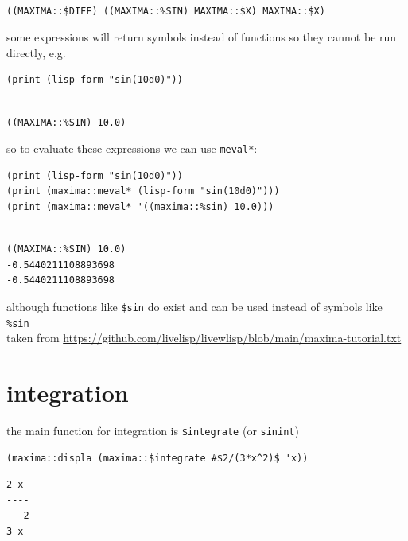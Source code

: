 \documentclass[a4paper,12pt]{article}
\begin{document}
\begin{verbatim}

((MAXIMA::$DIFF) ((MAXIMA::%SIN) MAXIMA::$X) MAXIMA::$X) 
\end{verbatim}


some expressions will return symbols instead of functions so they cannot be run directly, e.g.\\
\lstset{language=Lisp,label= ,caption= ,captionpos=b,numbers=none}
\begin{lstlisting}
(print (lisp-form "sin(10d0)"))
\end{lstlisting}

\begin{verbatim}

((MAXIMA::%SIN) 10.0) 
\end{verbatim}


so to evaluate these expressions we can use \texttt{meval*}:\\
\lstset{language=Lisp,label= ,caption= ,captionpos=b,numbers=none}
\begin{lstlisting}
(print (lisp-form "sin(10d0)"))
(print (maxima::meval* (lisp-form "sin(10d0)")))
(print (maxima::meval* '((maxima::%sin) 10.0)))
\end{lstlisting}

\begin{verbatim}

((MAXIMA::%SIN) 10.0) 
-0.5440211108893698 
-0.5440211108893698 
\end{verbatim}


although functions like \texttt{\$sin} do exist and can be used instead of symbols like \texttt{\%sin}\\
taken from \url{https://github.com/livelisp/livewlisp/blob/main/maxima-tutorial.txt}\\
\section{integration}
\label{sec:org70cb455}
the main function for integration is \texttt{\$integrate} (or \texttt{sinint})\\
\lstset{language=Lisp,label= ,caption= ,captionpos=b,numbers=none}
\begin{lstlisting}
(maxima::displa (maxima::$integrate #$2/(3*x^2)$ 'x))
\end{lstlisting}

\begin{verbatim}
2 x
----
   2
3 x
\end{verbatim}
\end{document}

